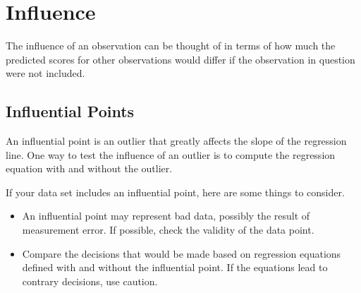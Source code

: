 \documentclass[residuals.tex]{subfiles}
\begin{document}
\Large
\newpage
\section{Influence}
	The influence of an observation can be thought of in terms of how much the predicted scores for other observations would differ if the observation in question were not included. 
	
	
	
	\subsection{Influential Points}
	
	An influential point is an outlier that greatly affects the slope of the regression line. One way to test the influence of an outlier is to compute the regression equation with and without the outlier.
	
	
	If your data set includes an influential point, here are some things to consider.
	
	
	\begin{itemize}
		\item An influential point may represent bad data, possibly the result of measurement error. If possible, check the validity of the data point.
		
		\item Compare the decisions that would be made based on regression equations defined with and without the influential point. If the equations lead to contrary decisions, use caution.
		
	\end{itemize}
\end{document}

